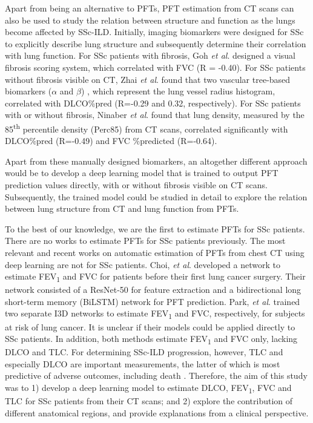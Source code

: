 Apart from being an alternative to PFTs, PFT estimation from CT scans can also be used to study the relation between structure and function as the lungs become affected by SSc-ILD. Initially, imaging biomarkers were designed for SSc to explicitly describe lung structure and subsequently determine their correlation with lung function. For SSc patients with fibrosis, Goh \textit{et al}. \cite{Goh2007} designed a visual fibrosis scoring system, which correlated with FVC (R = -0.40). For SSc patients without fibrosis visible on CT, Zhai \textit{et al}. \cite{Zhai2019} found that two vascular tree-based biomarkers ($\alpha$ and $\beta$) , which represent the lung vessel radius histogram, correlated with DLCO\%pred (R=-0.29 and 0.32, respectively). For SSc patients with or without fibrosis, Ninaber \textit{et al}. \cite{Ninaber2015} found that lung density, measured by the 85\textsuperscript{th} percentile density (Perc85) from CT scans, correlated significantly with DLCO\%pred (R=-0.49) and FVC \%predicted (R=-0.64). 

Apart from these manually designed biomarkers, an altogether different approach would be to develop a deep learning model that is trained to output PFT prediction values directly, with or without fibrosis visible on CT scans. Subsequently, the trained model could be studied in detail to explore the relation between lung structure from CT and lung function from PFTs.

To the best of our knowledge, we are the first to estimate PFTs for SSc patients. There are no works to estimate PFTs for SSc patients previously. The most relevant and recent works on automatic estimation of PFTs from chest CT using deep learning \cite{choi2022automated, Park2023} are not for SSc patients. Choi, \textit{et al}. \cite{choi2022automated} developed a network to estimate FEV\textsubscript{1} and FVC for patients before their first lung cancer surgery. Their network consisted of a ResNet-50 for feature extraction and a bidirectional long short-term memory (BiLSTM) network for PFT prediction. Park, \textit{et al}. \cite{Park2023} trained two separate I3D networks to estimate FEV\textsubscript{1} and FVC, respectively, for subjects at risk of lung cancer. It is unclear if their models could be applied directly to SSc patients. In addition, both methods estimate FEV\textsubscript{1} and FVC only, lacking DLCO and TLC. For determining SSc-ILD progression, however, TLC and especially DLCO are important measurements, the latter of which is most predictive of adverse outcomes, including death \cite{Caron2018}. Therefore, the aim of this study was to 1) develop a deep learning model to estimate DLCO, FEV\textsubscript{1}, FVC and TLC for SSc patients from their CT scans; and 2) explore the contribution of different anatomical regions, and provide explanations from a clinical perspective.

